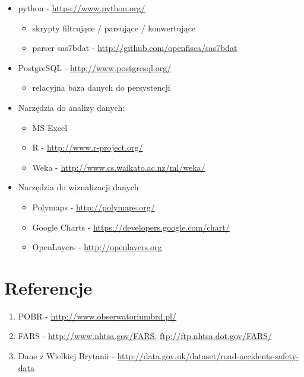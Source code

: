 \begin{itemize}
\item
  python - \url{https://www.python.org/}

  \begin{itemize}
  \itemsep-14pt\parskip0pt
  \item
    skrypty filtrujące / parsujące / konwertujące\\
  \item
    parser sas7bdat - \url{http://github.com/openfisca/sas7bdat}\\
  \end{itemize}
\item
  PostgreSQL - \url{http://www.postgresql.org/}

  \begin{itemize}
  \itemsep-14pt\parskip0pt
  \item
    relacyjna baza danych do persystencji\\
  \end{itemize}
\item
  Narzędzia do analizy danych:

  \begin{itemize}
  \itemsep-14pt\parskip0pt
  \item
    MS Excel\\
  \item
    R - \url{http://www.r-project.org/}\\
  \item
    Weka - \url{http://www.cs.waikato.ac.nz/ml/weka/}\\
  \end{itemize}
\item
  Narzędzia do wizualizacji danych

  \begin{itemize}
  \itemsep-14pt\parskip0pt
  \item
    Polymaps - \url{http://polymaps.org/}\\
  \item
    Google Charts - \url{https://developers.google.com/chart/}\\
  \item
    OpenLayers - \url{http://openlayers.org}
  \end{itemize}
\end{itemize}

\section{Referencje}\label{referencje}

\begin{enumerate}
\itemsep-14pt\parskip0pt
\item
  POBR - \url{http://www.obserwatoriumbrd.pl/}\\
\item
  FARS - \url{http://www.nhtsa.gov/FARS},
  \url{ftp://ftp.nhtsa.dot.gov/FARS/}\\
\item
  Dane z Wielkiej Brytanii -
  \url{http://data.gov.uk/dataset/road-accidents-safety-data}
\end{enumerate}
